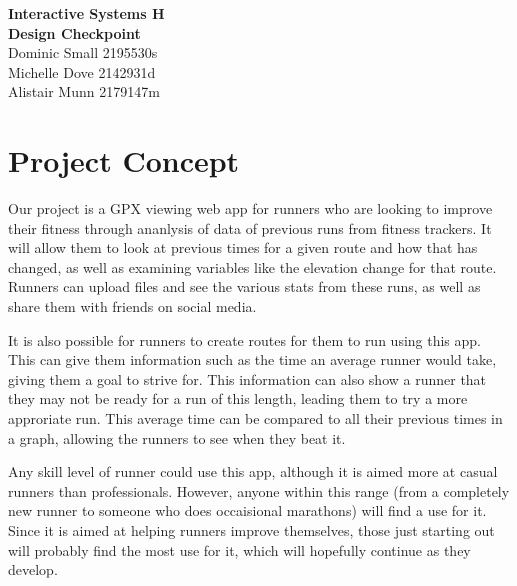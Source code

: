 \documentclass{article}
\begin{document}
\begin{center}
{\Huge \textbf{Interactive Systems H}}\\
{\huge \textbf{Design Checkpoint}}\\
\vspace{5mm}
Dominic Small 2195530s\\
Michelle Dove 2142931d\\
Alistair Munn 2179147m\\
\end{center}

\section{Project Concept}
\label{sec:project}
Our project is a GPX viewing web app for runners who are looking to improve their fitness through ananlysis of data of previous runs from fitness trackers. It will allow them to look at previous times for a given route and how that has changed, as well as examining variables like the elevation change for that route. Runners can upload files and see the various stats from these runs, as well as share them with friends on social media.

It is also possible for runners to create routes for them to run using this app. This can give them information such as the time an average runner would take, giving them a goal to strive for. This information can also show a runner that they may not be ready for a run of this length, leading them to try a more approriate run. This average time can be compared to all their previous times in a graph, allowing the runners to see when they beat it.

Any skill level of runner could use this app, although it is aimed more at casual runners than professionals. However, anyone within this range (from a completely new runner to someone who does occaisional marathons) will find a use for it. Since it is aimed at helping runners improve themselves, those just starting out will probably find the most use for it, which will hopefully continue as they develop.
\end{document}
